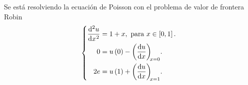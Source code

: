 \begin{solution}
      Se está resolviendo la ecuación de Poisson con el
      problema de valor de frontera Robin
      \begin{equation}\label{eq:poisson1drobindconditions2}
            \left\{
            \begin{aligned}
                  \diff[2]{u}{x}
                   & =1+x,
                  \text{ para }x\in\left[0,1\right].     \\
                  0
                   & = u\left(0\right)-\diff{u}{x}[x=0]. \\
                  2e
                   & =u\left(1\right)+\diff{u}{x}[x=1].  \\
            \end{aligned}
            \right.
      \end{equation}


\end{solution}
